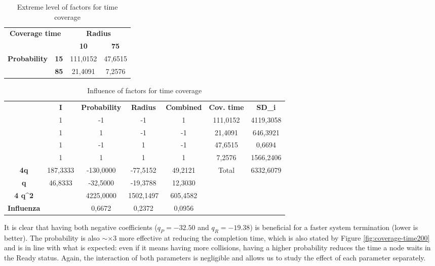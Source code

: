 \begin{table}[h!]
\centering
\begin{tabular}{|cc|cc|}
\hline
\multicolumn{2}{|c|}{\multirow{2}{*}{\textbf{Coverage time}}} & \multicolumn{2}{c|}{\textbf{Radius}} \\ \cline{3-4} 
\multicolumn{2}{|c|}{} & \multicolumn{1}{c|}{\textbf{10}} & \textbf{75} \\ \hline
\multicolumn{1}{|c|}{\multirow{2}{*}{\textbf{Probability}}} & \textbf{15} & \multicolumn{1}{c|}{111,0152} & 47,6515 \\ \cline{2-4} 
\multicolumn{1}{|c|}{} & \textbf{85} & \multicolumn{1}{c|}{21,4091} & 7,2576 \\ \hline
\end{tabular}
\caption{Extreme level of factors for time coverage}
\label{tab:extreme-factors-time-coverage}
\end{table}

\begin{table}[H]
\centering
\begin{tabular}{c|c|c|c|c|cc}
\cline{2-7}
 & \textbf{I} & \textbf{Probability} & \textbf{Radius} & \textbf{Combined} & \multicolumn{1}{c|}{\textbf{Cov. time}} & \multicolumn{1}{c|}{\textbf{SD\_i}} \\ \cline{2-7} 
 & 1 & -1 & -1 & 1 & \multicolumn{1}{c|}{111,0152} & \multicolumn{1}{c|}{4119,3058} \\ \cline{2-7} 
 & 1 & 1 & -1 & -1 & \multicolumn{1}{c|}{21,4091} & \multicolumn{1}{c|}{646,3921} \\ \cline{2-7} 
 & 1 & -1 & 1 & -1 & \multicolumn{1}{c|}{47,6515} & \multicolumn{1}{c|}{0,6694} \\ \cline{2-7} 
 & 1 & 1 & 1 & 1 & \multicolumn{1}{c|}{7,2576} & \multicolumn{1}{c|}{1566,2406} \\ \hline
\multicolumn{1}{|c|}{\textbf{4q}} & 187,3333 & -130,0000 & -77,5152 & 49,2121 & \multicolumn{1}{c|}{Total} & \multicolumn{1}{c|}{6332,6079} \\ \hline
\multicolumn{1}{|c|}{\textbf{q}} & 46,8333 & -32,5000 & -19,3788 & 12,3030 &  &  \\ \cline{1-5}
\multicolumn{1}{|c|}{\textbf{4 q\textasciicircum{}2}} &  & 4225,0000 & 1502,1497 & 605,4582 &  &  \\ \cline{1-5}
\multicolumn{1}{|c|}{\textbf{Influenza}} &  & 0,6672 & 0,2372 & 0,0956 &  &  \\ \cline{1-5}
\end{tabular}
\caption{Influence of factors for time coverage}
\label{tab:influence-on-time-coverage}
\end{table}

It is clear that having both negative coefficients ($q_P = -32.50$ and $q_R = -19.38$) is beneficial for a faster system termination (lower is better). The probability is also $\sim\times 3$ more effective at reducing the completion time, which is also stated by Figure \ref{fig:coverage-time200} and is in line with what is expected: even if it means having more collisions, having a higher probability reduces the time a node waits in the Ready status. Again, the interaction of both parameters is negligible and allows us to study the effect of each parameter separately.
